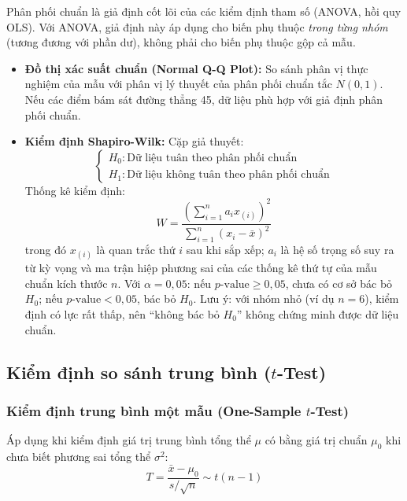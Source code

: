 \documentclass[12pt,a4paper]{article}
\newcommand{\xbar}{\bar{x}}
\begin{document}
Phân phối chuẩn là giả định cốt lõi của các kiểm định tham số (ANOVA, hồi quy OLS). Với
ANOVA, giả định này áp dụng cho biến phụ thuộc \emph{trong từng nhóm} (tương đương với phần
dư), không phải cho biến phụ thuộc gộp cả mẫu.
\begin{itemize}
  \item \textbf{Đồ thị xác suất chuẩn (Normal Q-Q Plot):} So sánh phân vị thực nghiệm của mẫu
  với phân vị lý thuyết của phân phối chuẩn tắc $N(0,1)$. Nếu các điểm bám sát đường thẳng
  45\textdegree, dữ liệu phù hợp với giả định phân phối chuẩn.
  \item \textbf{Kiểm định Shapiro-Wilk:} Cặp giả thuyết:
  \begin{equation}
    \begin{cases}
      H_0: \text{Dữ liệu tuân theo phân phối chuẩn}\\
      H_1: \text{Dữ liệu không tuân theo phân phối chuẩn}
    \end{cases}
  \end{equation}
  Thống kê kiểm định:
  \begin{equation}
    W = \frac{\left(\sum_{i=1}^{n} a_i x_{(i)}\right)^2}{\sum_{i=1}^{n}(x_i - \xbar)^2}
  \end{equation}
  trong đó $x_{(i)}$ là quan trắc thứ $i$ sau khi sắp xếp; $a_i$ là hệ số trọng số suy ra từ
  kỳ vọng và ma trận hiệp phương sai của các thống kê thứ tự của mẫu chuẩn kích thước $n$.
  Với $\alpha = 0{,}05$: nếu $p\text{-value} \ge 0{,}05$, chưa có cơ sở bác bỏ $H_0$; nếu
  $p\text{-value} < 0{,}05$, bác bỏ $H_0$. Lưu ý: với nhóm nhỏ (ví dụ $n = 6$), kiểm định có
  lực rất thấp, nên ``không bác bỏ $H_0$'' không chứng minh được dữ liệu chuẩn.
\end{itemize}

\subsection{Kiểm định so sánh trung bình ($t$-Test)}

\subsubsection{Kiểm định trung bình một mẫu (One-Sample $t$-Test)}

Áp dụng khi kiểm định giá trị trung bình tổng thể $\mu$ có bằng giá trị chuẩn $\mu_0$ khi chưa
biết phương sai tổng thể $\sigma^2$:
\begin{equation}
  T = \frac{\xbar - \mu_0}{s/\sqrt{n}} \sim t(n-1)
\end{equation}
\end{document}
